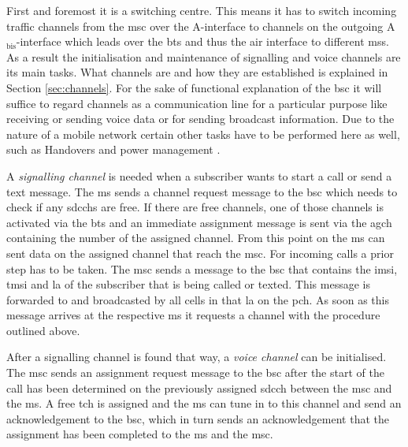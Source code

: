 First and foremost it is a switching centre.
This means it has to switch incoming traffic channels from the \gls{msc} over the A-interface to channels on the outgoing A$_\text{bis}$-interface which leads over the \gls{bts} and thus the air interface to different \glspl{ms}.
As a result the initialisation and maintenance of signalling and voice channels are its main tasks.
What channels are and how they are established is explained in Section \ref{sec:channels}.
For the sake of functional explanation of the \gls{bsc} it will suffice to regard channels as a communication line for a particular purpose like receiving or sending voice data or  for sending broadcast information.
Due to the nature of a mobile network certain other tasks have to be performed here as well, such as Handovers and power management \cite{kommsys2006}.

A \emph{signalling channel} is needed when a subscriber wants to start a call or send a text message.
The \gls{ms} sends a channel request message to the \gls{bsc} which needs to check if any \glspl{sdcch} are free.
If there are free channels, one of those channels is activated via the \gls{bts} and an immediate assignment message is sent via the \gls{agch} containing the number of the assigned channel.
From this point on the \gls{ms} can sent data on the assigned channel that reach the \gls{msc}.
For incoming calls a prior step has to be taken.
The \gls{msc} sends a message to the \gls{bsc} that contains the \gls{imsi}, \gls{tmsi} and \gls{la} of the subscriber that is being called or texted.
This message is forwarded to and broadcasted by all cells in that \gls{la} on the \gls{pch}.
As soon as this message arrives at the respective \gls{ms} it requests a channel with the procedure outlined above.

After a signalling channel is found that way, a \emph{voice channel} can be initialised.
The \gls{msc} sends an assignment request message to the \gls{bsc} after the start of the call has been determined on the previously assigned \gls{sdcch} between the \gls{msc} and the \gls{ms}.
A free \gls{tch} is assigned and the \gls{ms} can tune in to this channel and send an acknowledgement to the \gls{bsc}, which in turn sends an acknowledgement that the assignment has been completed to the \gls{ms} and the \gls{msc}.

